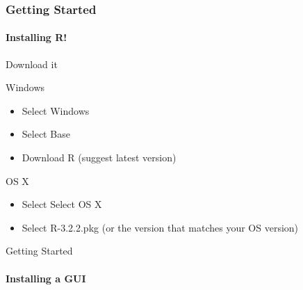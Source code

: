 \documentclass[12pt]{beamer}\usepackage[]{graphicx}\usepackage[]{color}
\begin{document}
\begin{frame}
  \frametitle{Getting Started}
  \framesubtitle{Installing R!}

  \begin{block}{Download it}
  \end{block}

  \begin{block}{Windows}
  \begin{itemize}
    \item Select Windows
    \item Select Base
    \item Download R (suggest latest version)
  \end{itemize}
  \end{block}

  \begin{block}{OS X}
  \begin{itemize}
    \item Select Select OS X
    \item Select R-3.2.2.pkg (or the version that matches your OS version)
  \end{itemize}
  \end{block}

\end{frame}

\begin{frame}{Getting Started}
\framesubtitle{Installing a GUI}

\end{frame}
\end{document}
